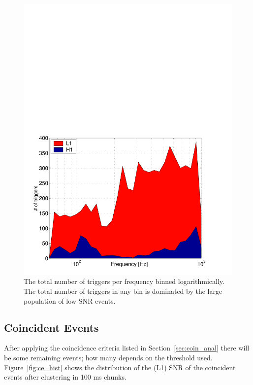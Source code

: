 \begin{figure}[!h]
\centerline{\includegraphics[angle=0,width=6.5in]{Figures/Chap7/f_hist_all.pdf}}
\caption[Number of triggers v. Frequency]{The total number of triggers per frequency
         binned logarithmically. The total number of triggers in any bin is dominated
         by the large population of low SNR events.}
\label{fig:hist_f}
\end{figure}



\subsection{Coincident Events}
After applying the coincidence criteria listed in Section~\ref{sec:coin_anal} 
there will be some remaining events; how many depends on the threshold used. 
Figure~\ref{fig:ce_hist} shows the distribution of the (L1) SNR of the 
coincident events after clustering in 100 ms chunks.

